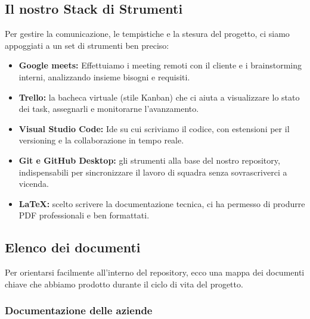 \documentclass[12pt, a4paper]{article}
\begin{document}
\subsection*{Il nostro Stack di Strumenti}
Per gestire la comunicazione, le tempistiche e la stesura del progetto, ci siamo appoggiati a un set di strumenti ben preciso:
\begin{itemize}[label=\textbullet]
    \item \textbf{Google meets:} Effettuiamo i meeting remoti con il cliente e i brainstorming interni, analizzando insieme bisogni e requisiti.
    \item \textbf{Trello:} la bacheca virtuale (stile Kanban) che ci aiuta a visualizzare lo stato dei task, assegnarli e monitorarne l'avanzamento.
    \item \textbf{Visual Studio Code:} Ide su cui scriviamo il codice, con estensioni per il versioning e la collaborazione in tempo reale.
    \item \textbf{Git e GitHub Desktop:} gli strumenti alla base del nostro repository, indispensabili per sincronizzare il lavoro di squadra senza sovrascriverci a vicenda.
    \item \textbf{LaTeX:} scelto scrivere la documentazione tecnica, ci ha permesso di produrre PDF professionali e ben formattati.
\end{itemize}

\subsection{Elenco dei documenti}
Per orientarsi facilmente all'interno del repository, ecco una mappa dei documenti chiave che abbiamo prodotto durante il ciclo di vita del progetto.

\subsubsection{Documentazione delle aziende}
\end{document}
